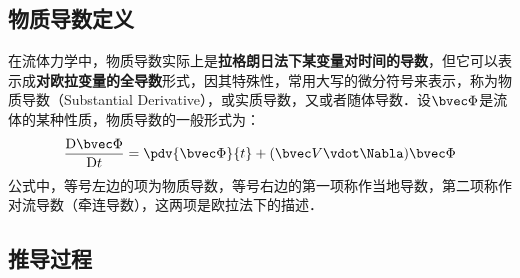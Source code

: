 
\subsection{物质导数定义}

在流体力学中，物质导数实际上是\textbf{拉格朗日法下某变量对时间的导数}，但它可以表示成\textbf{对欧拉变量的全导数}形式，因其特殊性，常用大写的微分符号来表示，称为物质导数（Substantial  Derivative），或实质导数，又或者随体导数．设$\bvec \Phi$是流体的某种性质，物质导数的一般形式为：
\begin{align}
\frac{\mathrm{D}\bvec \Phi }{\mathrm{D} t}=\pdv{\bvec \Phi}{t}+(\bvec V \vdot \Nabla)\bvec \Phi
\end{align}
公式中，等号左边的项为物质导数，等号右边的第一项称作当地导数，第二项称作对流导数（牵连导数），这两项是欧拉法下的描述．

\subsection{推导过程}
